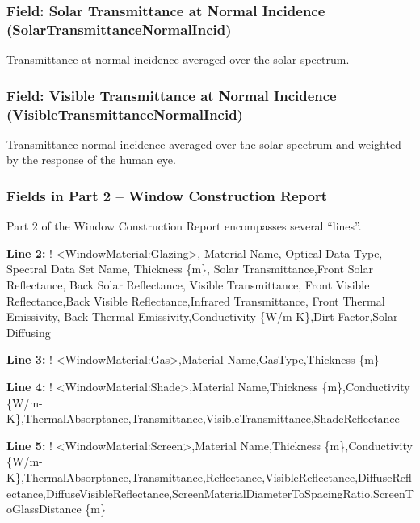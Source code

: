 \subsubsection{Field: Solar Transmittance at Normal Incidence (SolarTransmittanceNormalIncid)}\label{field-solar-transmittance-at-normal-incidence-solartransmittancenormalincid}

Transmittance at normal incidence averaged over the solar spectrum.

\subsubsection{Field: Visible Transmittance at Normal Incidence (VisibleTransmittanceNormalIncid)}\label{field-visible-transmittance-at-normal-incidence-visibletransmittancenormalincid}

Transmittance normal incidence averaged over the solar spectrum and weighted by the response of the human eye.

\subsubsection{Fields in Part 2 -- Window Construction Report}\label{fields-in-part-2-window-construction-report}

Part 2 of the Window Construction Report encompasses several ``lines''.

\textbf{Line 2:} ! \textless{}WindowMaterial:Glazing\textgreater{}, Material Name, Optical Data Type, Spectral Data Set Name, Thickness \{m\}, Solar Transmittance,Front Solar Reflectance, Back Solar Reflectance, Visible Transmittance, Front Visible Reflectance,Back Visible Reflectance,Infrared Transmittance, Front Thermal Emissivity, Back Thermal Emissivity,Conductivity \{W/m-K\},Dirt Factor,Solar Diffusing

\textbf{Line 3:} ! \textless{}WindowMaterial:Gas\textgreater{},Material Name,GasType,Thickness \{m\}

\textbf{Line 4:} ! \textless{}WindowMaterial:Shade\textgreater{},Material Name,Thickness \{m\},Conductivity \{W/m-K\},ThermalAbsorptance,Transmittance,VisibleTransmittance,ShadeReflectance

\textbf{Line 5:} ! \textless{}WindowMaterial:Screen\textgreater{},Material Name,Thickness \{m\},Conductivity \{W/m-K\},ThermalAbsorptance,Transmittance,Reflectance,VisibleReflectance,DiffuseReflectance,DiffuseVisibleReflectance,ScreenMaterialDiameterToSpacingRatio,ScreenToGlassDistance \{m\}

